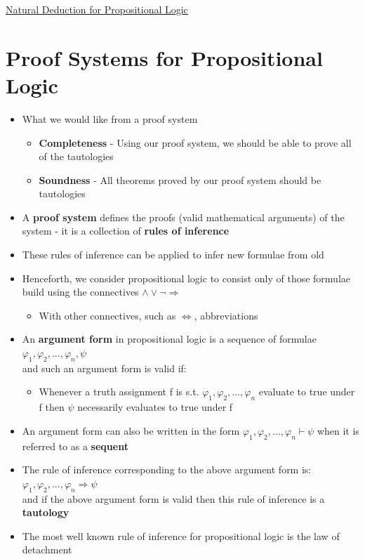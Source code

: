 \documentclass{article}[18pt]
\begin{document}
\begin{center}
\underline{\huge Natural Deduction for Propositional Logic}
\end{center}
\section{Proof Systems for Propositional Logic}
\begin{itemize}
\item What we would like from a proof system
\begin{itemize}
\item \textbf{Completeness} - Using our proof system, we should be able to prove all of the tautologies
\item \textbf{Soundness} - All theorems proved by our proof system should be tautologies
\end{itemize}

\item A \textbf{proof system} defines the proofs (valid mathematical arguments) of the system - it is a collection of \textbf{rules of inference}
\item These rules of inference can be applied to infer new formulae from old
\item Henceforth, we consider propositional logic to consist only of those formulae build using the connectives $\land \lor \lnot \Rightarrow$
\begin{itemize}
\item With other connectives, such as $\Leftrightarrow$, abbreviations
\end{itemize}
\item An \textbf{argument form} in propositional logic is a sequence of formulae\\
$\varphi_1,\varphi_2,...,\varphi_n,\psi$\\
and such an argument form is valid if:
\begin{itemize}
\item Whenever a truth assignment f is s.t. $\varphi_1,\varphi_2,...,\varphi_n$ evaluate to true under f then $\psi$ necessarily evaluates to true under f

\end{itemize}
\item An argument form can also be written in the form $\varphi_1,\varphi_2,...,\varphi_n\vdash\psi$ when it is referred to as a \textbf{sequent}
\item The rule of inference corresponding to the above argument form is:\\
$\varphi_1,\varphi_2,...,\varphi_n\Rightarrow \psi$\\
and if the above argument form is valid then this rule of inference is a \textbf{tautology}
\item The most well known rule of inference for propositional logic is the law of detachment
\end{itemize}
\end{document}
